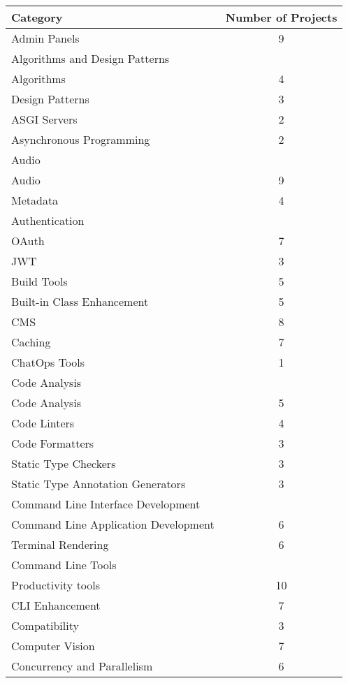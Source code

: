
\begin{table}[ht]
    \centering
    \begin{tabular}{|l|c|}
    \hline
    \textbf{Category} & \textbf{Number of Projects}\\
    \hline
    Admin Panels & 9\\
    Algorithms and Design Patterns & \\
    Algorithms & 4\\
    Design Patterns & 3\\
    ASGI Servers & 2\\
    Asynchronous Programming & 2\\
    Audio & \\
    Audio & 9\\
    Metadata & 4\\
    Authentication & \\
    OAuth & 7\\
    JWT & 3\\
    Build Tools & 5\\
    Built-in Class Enhancement & 5\\
    CMS & 8\\
    Caching & 7\\
    ChatOps Tools & 1\\
    Code Analysis & \\
    Code Analysis & 5\\
    Code Linters & 4\\
    Code Formatters & 3\\
    Static Type Checkers & 3\\
    Static Type Annotation Generators & 3\\
    Command Line Interface Development & \\
    Command Line Application Development & 6\\
    Terminal Rendering & 6\\
    Command Line Tools & \\
    Productivity tools & 10\\
    CLI Enhancement & 7\\
    Compatibility & 3\\
    Computer Vision & 7\\
    Concurrency and Parallelism & 6\\

\end{tabular}
\end{table}
